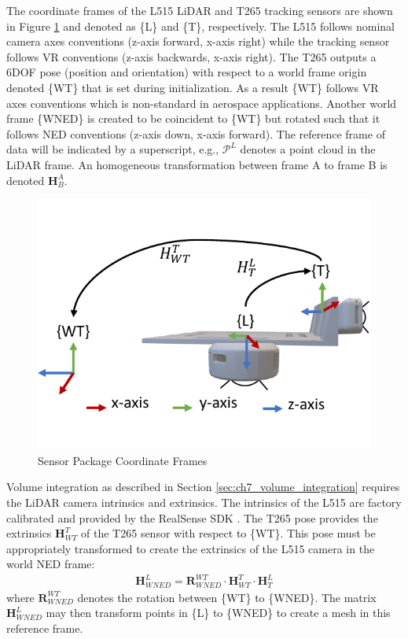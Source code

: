The coordinate frames of the L515 LiDAR and T265 tracking sensors are shown in Figure \ref{fig:ch7_sensor_frames} and denoted as \{L\} and \{T\}, respectively. The L515 follows nominal camera axes conventions (z-axis forward, x-axis right) while the tracking sensor follows \acf{VR} conventions (z-axis backwards, x-axis right). The T265 outputs a 6DOF pose (position and orientation) with respect to a world frame origin denoted \{WT\} that is set during initialization. As a result \{WT\} follows \ac{VR} axes conventions which is non-standard in aerospace applications. Another world frame \{WNED\} is created to be coincident to \{WT\} but rotated such that it follows NED conventions (z-axis down, x-axis forward). The reference frame of data will be indicated by a superscript, e.g., $\mathcal{P}^{L}$ denotes a point cloud in the LiDAR frame. An homogeneous transformation between frame A to frame B is denoted $\mathbf{H}^A_B$.

\begin{figure}[!htb]
  \centering
  \includegraphics[page=1,clip,trim=0cm 1cm 0cm 1cm,width=.45\linewidth]{chapter_7_experiments/imgs/sensor_frames.pdf}
  \caption[Sensor Package Coordinate Frames]{Sensor Package Coordinate Frames}\label{fig:ch7_sensor_frames}
\end{figure}
Volume integration as described in Section \ref{sec:ch7_volume_integration} requires the LiDAR camera intrinsics and extrinsics. The intrinsics of the L515 are factory calibrated and provided by the RealSense SDK \cite{noauthor_github_2020-4}. The T265 pose provides the extrinsics $\mathbf{H}^{T}_{WT}$  of the T265 sensor with respect to \{WT\}. This pose must be appropriately transformed to create the extrinsics of the L515 camera in the world NED frame:
\begin{align*}
   \mathbf{H}^{L}_{WNED}  =  \mathbf{R}^{WT}_{WNED} \cdot \mathbf{H}^{T}_{WT} \cdot \mathbf{H}^{L}_{T}
\end{align*}
where $\mathbf{R}^{WT}_{WNED}$ denotes the rotation between \{WT\} to \{WNED\}. The matrix $\mathbf{H}^{L}_{WNED}$ may then transform points in \{L\} to \{WNED\} to create a mesh in this reference frame.

